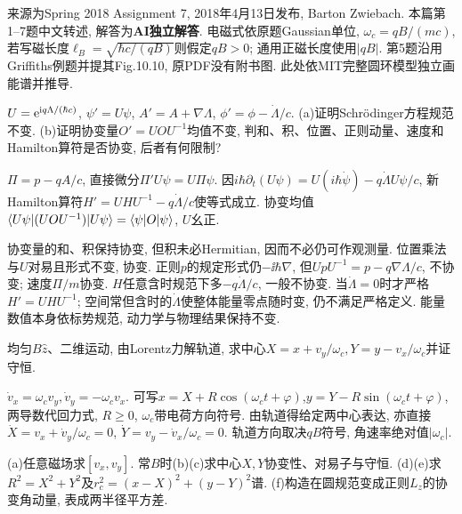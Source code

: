 来源为Spring 2018 Assignment 7, 2018年4月13日发布, Barton Zwiebach. 本篇第1--7题中文转述, 解答为\textbf{AI独立解答}. 电磁式依原题Gaussian单位, $\omega_c=qB/(mc)$, 若写磁长度$\ell_B=\sqrt{\hbar c/(qB)}$则假定$qB>0$; 通用正磁长度使用$|qB|$. 第5题沿用Griffiths例题并提其Fig.10.10, 原PDF没有附书图. 此处依MIT完整圆环模型独立画能谱并推导.
\begin{exercise}
$U=\mathrm e^{\mathrm i q\Lambda/(\hbar c)}$, $\psi'=U\psi$, $A'=A+\nabla\Lambda$, $\phi'=\phi-\dot\Lambda/c$. (a)证明Schrödinger方程规范不变. (b)证明协变量$O'=UOU^{-1}$均值不变, 判和、积、位置、正则动量、速度和Hamilton算符是否协变, 后者有何限制?
\end{exercise}
\begin{solution}
$\Pi=p-qA/c$, 直接微分$\Pi' U\psi=U\Pi\psi$. 因$i\hbar\partial_t(U\psi)=U(i\hbar\dot\psi)-q\dot\Lambda U\psi/c$, 新Hamilton算符$H'=UH U^{-1}-q\dot\Lambda/c$使等式成立. 协变均值$\langle U\psi\rvert(UOU^{-1})\lvert U\psi\rangle=\langle \psi\rvert O\lvert \psi\rangle$, $U$幺正.

协变量的和、积保持协变, 但积未必Hermitian, 因而不必仍可作观测量. 位置乘法与$U$对易且形式不变, 协变. 正则$p$的规定形式仍$-\ii\hbar\nabla$, 但$UpU^{-1}=p-q\nabla\Lambda/c$, 不协变; 速度$\Pi/m$协变. $H$任意含时规范下多$-q\dot\Lambda/c$, 一般不协变. 当$\dot\Lambda=0$时才严格$H'=UHU^{-1}$; 空间常但含时的$\dot\Lambda$使整体能量零点随时变, 仍不满足严格定义. 能量数值本身依标势规范, 动力学与物理结果保持不变.
\end{solution}
\begin{exercise}
均匀$B\hat z$、二维运动, 由Lorentz力解轨道, 求中心$X=x+v_y/\omega_c,Y=y-v_x/\omega_c$并证守恒.
\end{exercise}
\begin{solution}
$\dot v_x=\omega_cv_y,\dot v_y=-\omega_cv_x$. 可写$x=X+R\cos(\omega_ct+\varphi)$,$y=Y-R\sin(\omega_ct+\varphi)$, 两导数代回力式, $R\ge0$, $\omega_c$带电荷方向符号. 由轨道得给定两中心表达, 亦直接$\dot X=v_x+\dot v_y/\omega_c=0$, $\dot Y=v_y-\dot v_x/\omega_c=0$. 轨道方向取决$qB$符号, 角速率绝对值$|\omega_c|$.
\end{solution}
\begin{exercise}
(a)任意磁场求$[v_x,v_y]$. 常$B$时(b)(c)求中心$X,Y$协变性、对易子与守恒. (d)(e)求$R^2=X^2+Y^2$及$r_c^2=(x-X)^2+(y-Y)^2$谱. (f)构造在圆规范变成正则$L_z$的协变角动量, 表成两半径平方差.
\end{exercise}
